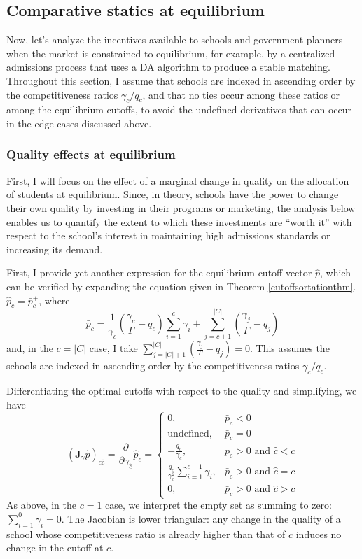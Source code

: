 \documentclass[12pt]{article}
\theoremstyle{definition}
\begin{document}
\subsection{Comparative statics at equilibrium} \label{compstateq}
Now, let's analyze the incentives available to schools and government planners when the market is constrained to equilibrium, for example, by a centralized admissions process that uses a DA algorithm to produce a stable matching. Throughout this section, I assume that schools are indexed in ascending order by the competitiveness ratios $\gamma_c / q_c$, and that no ties occur among these ratios or among the equilibrium cutoffs, to avoid the undefined derivatives that can occur in the edge cases discussed above. 

\subsubsection{Quality effects at equilibrium}
First, I will focus on the effect of a marginal change in quality on the allocation of students at equilibrium. Since, in theory, schools have the power to change their own quality by investing in their programs or marketing, the analysis below enables us to quantify the extent to which these investments are ``worth it'' with respect to the school's interest in maintaining high admissions standards or increasing its demand. 

First, I provide yet another expression for the equilibrium cutoff vector $\hat p$, which can be verified by expanding the equation given in Theorem \ref{cutoffsortationthm}. $\hat p_c = \bar p_c^+$, where
\begin{equation} \label{yetanothereqcutoff}
\bar p_c = 
\frac{1}{\gamma_c} \left(\frac{\gamma_c}{\Gamma} - q_c\right) \sum_{i=1}^{c} \gamma_i 
+ \sum_{j=c+1}^{|C|} \left( \frac{\gamma_j}{\Gamma} - q_j \right)
\end{equation}
and, in the $c = |C|$ case, I take $\sum_{j=|C|+1}^{|C|} \left( \frac{\gamma_j}{\Gamma} - q_j \right)= 0$. This assumes the schools are indexed in ascending order by the competitiveness ratios $\gamma_c / q_c$. 

Differentiating the optimal cutoffs with respect to the quality and simplifying, we have
\begin{equation}\label{jac-gamma-p}
\left(\mathbf{J}_\gamma \hat p\right)_{c\hat c} =
\frac{\partial}{\partial\gamma_{\hat c}} \hat p_c = \begin{cases}
0, & \bar p_c < 0 \\
\text{undefined}, & \bar p_c = 0 \\
 - \frac{q_c}{\gamma_c}, & \bar p_c > 0 \text{ and }\hat c < c \\
\frac{q_c}{\gamma_c^2} \sum_{i=1}^{c-1} \gamma_i, & \bar p_c > 0 \text{ and }\hat c = c\\
0, & \bar p_c > 0 \text{ and }\hat c > c
\end{cases}
\end{equation}
As above, in the $c=1$ case, we interpret the empty set as summing to zero: $\sum_{i=1}^{0} \gamma_i = 0$. The Jacobian is lower triangular: any change in the quality of a school whose competitiveness ratio is already higher than that of $c$ induces no change in the cutoff at $c$.
\end{document}
